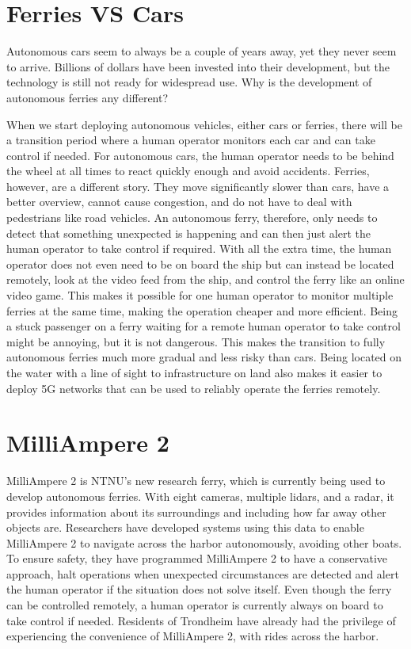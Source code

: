 \documentclass{iopconfser}
\begin{document}
\section*{Ferries VS Cars}
Autonomous cars seem to always be a couple of years away, yet they never seem to arrive.
Billions of dollars have been invested into their development, but the technology is still not ready for widespread use.
Why is the development of autonomous ferries any different?

When we start deploying autonomous vehicles, either cars or ferries, there will be a transition period where a human operator monitors each car and can take control if needed.
For autonomous cars, the human operator needs to be behind the wheel at all times to react quickly enough and avoid accidents.
Ferries, however, are a different story.
They move significantly slower than cars, have a better overview, cannot cause congestion, and do not have to deal with pedestrians like road vehicles.
An autonomous ferry, therefore, only needs to detect that something unexpected is happening and can then just alert the human operator to take control if required.
With all the extra time, the human operator does not even need to be on board the ship but can instead be located remotely, look at the video feed from the ship, and control the ferry like an online video game.
This makes it possible for one human operator to monitor multiple ferries at the same time, making the operation cheaper and more efficient.
Being a stuck passenger on a ferry waiting for a remote human operator to take control might be annoying, but it is not dangerous.
This makes the transition to fully autonomous ferries much more gradual and less risky than cars.
Being located on the water with a line of sight to infrastructure on land also makes it easier to deploy 5G networks that can be used to reliably operate the ferries remotely.

\section*{MilliAmpere 2}
MilliAmpere 2 is NTNU's new research ferry, which is currently being used to develop autonomous ferries.
With eight cameras, multiple lidars, and a radar, it provides information about its surroundings and including how far away other objects are.
Researchers have developed systems using this data to enable MilliAmpere 2 to navigate across the harbor autonomously, avoiding other boats.
To ensure safety, they have programmed MilliAmpere 2 to have a conservative approach, halt operations when unexpected circumstances are detected and alert the human operator if the situation does not solve itself.
Even though the ferry can be controlled remotely, a human operator is currently always on board to take control if needed.
Residents of Trondheim have already had the privilege of experiencing the convenience of MilliAmpere 2, with rides across the harbor.
\end{document}
